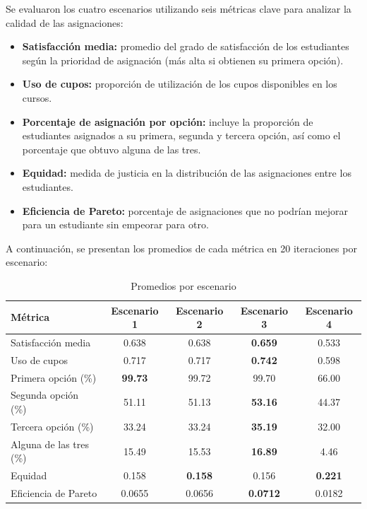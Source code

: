 \documentclass{article}
\begin{document}
Se evaluaron los cuatro escenarios utilizando seis métricas clave para analizar la calidad de las asignaciones:

\begin{itemize}
  \item \textbf{Satisfacción media:} promedio del grado de satisfacción de los estudiantes según la prioridad de asignación (más alta si obtienen su primera opción).
  \item \textbf{Uso de cupos:} proporción de utilización de los cupos disponibles en los cursos.
  \item \textbf{Porcentaje de asignación por opción:} incluye la proporción de estudiantes asignados a su primera, segunda y tercera opción, así como el porcentaje que obtuvo alguna de las tres.
  \item \textbf{Equidad:} medida de justicia en la distribución de las asignaciones entre los estudiantes.
  \item \textbf{Eficiencia de Pareto:} porcentaje de asignaciones que no podrían mejorar para un estudiante sin empeorar para otro.
\end{itemize}

A continuación, se presentan los promedios de cada métrica en 20 iteraciones por escenario:

\begin{table}[H]
\centering
\caption{Promedios por escenario}
\begin{tabular}{lcccc}
\toprule
\textbf{Métrica} & \textbf{Escenario 1} & \textbf{Escenario 2} & \textbf{Escenario 3} & \textbf{Escenario 4} \\
\midrule
Satisfacción media & 0.638 & 0.638 & \textbf{0.659} & 0.533 \\
Uso de cupos & 0.717 & 0.717 & \textbf{0.742} & 0.598 \\
Primera opción (\%) & \textbf{99.73} & 99.72 & 99.70 & 66.00 \\
Segunda opción (\%) & 51.11 & 51.13 & \textbf{53.16} & 44.37 \\
Tercera opción (\%) & 33.24 & 33.24 & \textbf{35.19} & 32.00 \\
Alguna de las tres (\%) & 15.49 & 15.53 & \textbf{16.89} & 4.46 \\
Equidad & 0.158 & \textbf{0.158} & 0.156 & \textbf{0.221} \\
Eficiencia de Pareto & 0.0655 & 0.0656 & \textbf{0.0712} & 0.0182 \\
\bottomrule
\end{tabular}
\end{table}
\end{document}
